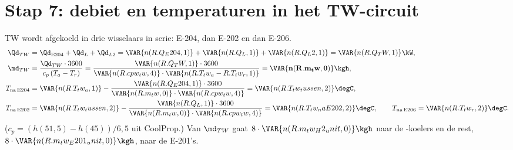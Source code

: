 \section{Stap 7: debiet en temperaturen in het TW-circuit}
TW wordt afgekoeld in drie wisselaars in serie: E-204, dan E-202 en dan E-206.
\begin{align*}
\Qd_{TW} &= \Qd_\mathrm{E204} + \Qd_L + \Qd_{L2} = \VAR{n(R.Q_E204,1)} + \VAR{n(R.Q_L,1)} + \VAR{n(R.Q_L2,1)} = \VAR{n(R.Q_TW,1)}\kW,\\
\md_{TW} &= \frac{\Qd_{TW}\cdot3600}{c_p\,(T_a - T_r)} = \frac{\VAR{n(R.Q_TW,1)}\cdot3600}{\VAR{n(R.cpw_tw,4)}\cdot\VAR{n(R.T_tw_a - R.T_tw_r,1)}} = \mathbf{\VAR{n(R.m_tw,0)}\kgh},\\
T_\mathrm{na\,E204} &= \VAR{n(R.T_tw_a,1)} - \frac{\VAR{n(R.Q_E204,1)}\cdot3600}{\VAR{n(R.m_tw,0)}\cdot\VAR{n(R.cpw_tw,4)}} = \VAR{n(R.T_tw_tussen,2)}\degC,\\
T_\mathrm{na\,E202} &= \VAR{n(R.T_tw_tussen,2)} - \frac{\VAR{n(R.Q_L,1)}\cdot3600}{\VAR{n(R.m_tw,0)}\cdot\VAR{n(R.cpw_tw,4)}} = \VAR{n(R.T_tw_naE202,2)}\degC,\qquad
T_\mathrm{na\,E206} = \VAR{n(R.T_tw_r,2)}\degC .
\end{align*}
($c_p = (h(51{,}5)-h(45))/6{,}5$ uit CoolProp.)
Van $\md_{TW}$ gaat $8\cdot\VAR{n(R.m_tw_H2_unit,0)}\kgh$ naar de \HH-koelers en de rest, $8\cdot\VAR{n(R.m_tw_E201_unit,0)}\kgh$, naar de E-201's.

